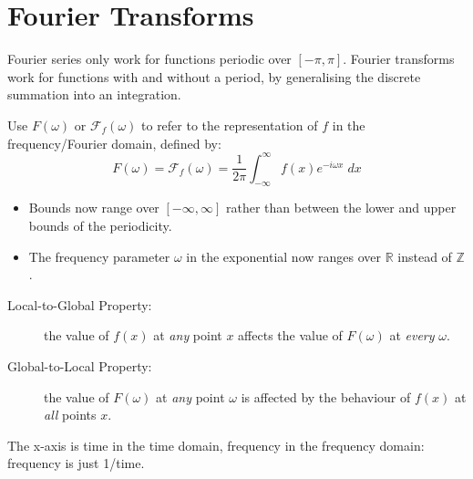 \documentclass[a4paper, 11pt]{article}
\begin{document}
\section*{Fourier Transforms}
{
    Fourier series only work for functions periodic over \([-\pi,\pi]\). Fourier transforms work for functions with and without a period, by generalising the discrete summation into an integration. 

    Use \(F(\omega)\) or \(\mathcal{F}_f(\omega)\) to refer to the representation of \(f\) in the frequency/Fourier domain, defined by:
    \[F(\omega) = \mathcal{F}_f(\omega) = \frac{1}{2\pi}\int_{-\infty}^\infty{f(x)e^{-i\omega x}\;dx}\]

    \begin{itemize}
    \item Bounds now range over \([-\infty,\infty]\) rather than between the lower and upper bounds of the periodicity.
    \item The frequency parameter \(\omega\) in the exponential now ranges over \(\mathbb{R}\) instead of \(\mathbb{Z}\).
    \end{itemize}

    \begin{description}
    \item[Local-to-Global Property:] the value of \(f(x)\) at \textit{any} point \(x\) affects the value of \(F(\omega)\) at \textit{every} \(\omega\).
    \item[Global-to-Local Property:] the value of \(F(\omega)\) at \textit{any} point \(\omega\) is affected by the behaviour of \(f(x)\) at \textit{all} points \(x\).
    \end{description}

    The x-axis is time in the time domain, frequency in the frequency domain: frequency is just 1/time.
}
\end{document}
